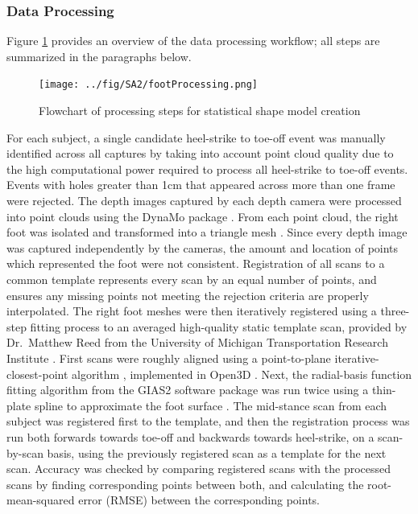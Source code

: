\documentclass[defaultstyle,11pt]{thesis}
\begin{document}
\hypertarget{data-processing}{%
\subsubsection{Data Processing}\label{data-processing}}

Figure \ref{fig:dataflow} provides an overview of the data processing workflow; all steps are summarized in the paragraphs below.

\begin{figure}
\hypertarget{fig:dataflow}{%
\centering
\texttt{[image: ../fig/SA2/footProcessing.png]}
\caption{Flowchart of processing steps for statistical shape model creation}\label{fig:dataflow}
}
\end{figure}

For each subject, a single candidate heel-strike to toe-off event was manually identified across all captures by taking into account point cloud quality due to the high computational power required to process all heel-strike to toe-off events.
Events with holes greater than 1cm that appeared across more than one frame were rejected.
The depth images captured by each depth camera were processed into point clouds using the DynaMo package \citep{Boppana2019}.
From each point cloud, the right foot was isolated and transformed into a triangle mesh \citep{Rusu2011, Fischler1981, Bernardini1999, Zhou2018}.
Since every depth image was captured independently by the cameras, the amount and location of points which represented the foot were not consistent.
Registration of all scans to a common template represents every scan by an equal number of points, and ensures any missing points not meeting the rejection criteria are properly interpolated.
The right foot meshes were then iteratively registered using a three-step fitting process to an averaged high-quality static template scan, provided by Dr.~Matthew Reed from the University of Michigan Transportation Research Institute \citep{Reed2013}.
First scans were roughly aligned using a point-to-plane iterative-closest-point algorithm \citep{Chen1992}, implemented in Open3D \citep{Zhou2018}.
Next, the radial-basis function fitting algorithm from the GIAS2 software package \citep{Zhang2016} was run twice using a thin-plate spline to approximate the foot surface \citep{Park2015a, Kim2016}.
The mid-stance scan from each subject was registered first to the template, and then the registration process was run both forwards towards toe-off and backwards towards heel-strike, on a scan-by-scan basis, using the previously registered scan as a template for the next scan.
Accuracy was checked by comparing registered scans with the processed scans by finding corresponding points between both, and calculating the root-mean-squared error (RMSE) between the corresponding points.
\end{document}
